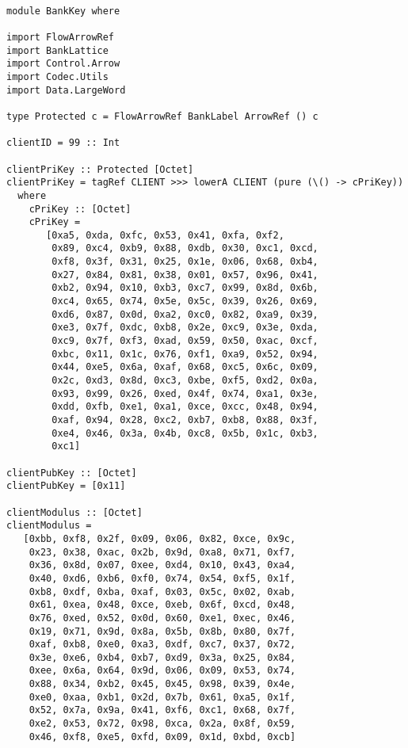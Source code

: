 \begin{Verbatim}[fontsize=\footnotesize,frame=lines,
                 framesep=5mm, label={[BankKey.hs]BankKey.hs}]

module BankKey where

import FlowArrowRef
import BankLattice
import Control.Arrow
import Codec.Utils
import Data.LargeWord

type Protected c = FlowArrowRef BankLabel ArrowRef () c

clientID = 99 :: Int

clientPriKey :: Protected [Octet]
clientPriKey = tagRef CLIENT >>> lowerA CLIENT (pure (\() -> cPriKey)) 
  where
    cPriKey :: [Octet]
    cPriKey =  
       [0xa5, 0xda, 0xfc, 0x53, 0x41, 0xfa, 0xf2,
        0x89, 0xc4, 0xb9, 0x88, 0xdb, 0x30, 0xc1, 0xcd,
        0xf8, 0x3f, 0x31, 0x25, 0x1e, 0x06, 0x68, 0xb4,
        0x27, 0x84, 0x81, 0x38, 0x01, 0x57, 0x96, 0x41,
        0xb2, 0x94, 0x10, 0xb3, 0xc7, 0x99, 0x8d, 0x6b,
        0xc4, 0x65, 0x74, 0x5e, 0x5c, 0x39, 0x26, 0x69,
        0xd6, 0x87, 0x0d, 0xa2, 0xc0, 0x82, 0xa9, 0x39,
        0xe3, 0x7f, 0xdc, 0xb8, 0x2e, 0xc9, 0x3e, 0xda,
        0xc9, 0x7f, 0xf3, 0xad, 0x59, 0x50, 0xac, 0xcf,
        0xbc, 0x11, 0x1c, 0x76, 0xf1, 0xa9, 0x52, 0x94,
        0x44, 0xe5, 0x6a, 0xaf, 0x68, 0xc5, 0x6c, 0x09,
        0x2c, 0xd3, 0x8d, 0xc3, 0xbe, 0xf5, 0xd2, 0x0a,
        0x93, 0x99, 0x26, 0xed, 0x4f, 0x74, 0xa1, 0x3e,
        0xdd, 0xfb, 0xe1, 0xa1, 0xce, 0xcc, 0x48, 0x94,
        0xaf, 0x94, 0x28, 0xc2, 0xb7, 0xb8, 0x88, 0x3f,
        0xe4, 0x46, 0x3a, 0x4b, 0xc8, 0x5b, 0x1c, 0xb3,
        0xc1]

clientPubKey :: [Octet]
clientPubKey = [0x11]

clientModulus :: [Octet]
clientModulus = 
   [0xbb, 0xf8, 0x2f, 0x09, 0x06, 0x82, 0xce, 0x9c,
    0x23, 0x38, 0xac, 0x2b, 0x9d, 0xa8, 0x71, 0xf7,
    0x36, 0x8d, 0x07, 0xee, 0xd4, 0x10, 0x43, 0xa4,
    0x40, 0xd6, 0xb6, 0xf0, 0x74, 0x54, 0xf5, 0x1f,
    0xb8, 0xdf, 0xba, 0xaf, 0x03, 0x5c, 0x02, 0xab,
    0x61, 0xea, 0x48, 0xce, 0xeb, 0x6f, 0xcd, 0x48,
    0x76, 0xed, 0x52, 0x0d, 0x60, 0xe1, 0xec, 0x46,
    0x19, 0x71, 0x9d, 0x8a, 0x5b, 0x8b, 0x80, 0x7f,
    0xaf, 0xb8, 0xe0, 0xa3, 0xdf, 0xc7, 0x37, 0x72,
    0x3e, 0xe6, 0xb4, 0xb7, 0xd9, 0x3a, 0x25, 0x84,
    0xee, 0x6a, 0x64, 0x9d, 0x06, 0x09, 0x53, 0x74,
    0x88, 0x34, 0xb2, 0x45, 0x45, 0x98, 0x39, 0x4e,
    0xe0, 0xaa, 0xb1, 0x2d, 0x7b, 0x61, 0xa5, 0x1f,
    0x52, 0x7a, 0x9a, 0x41, 0xf6, 0xc1, 0x68, 0x7f,
    0xe2, 0x53, 0x72, 0x98, 0xca, 0x2a, 0x8f, 0x59,
    0x46, 0xf8, 0xe5, 0xfd, 0x09, 0x1d, 0xbd, 0xcb]


\end{Verbatim}
